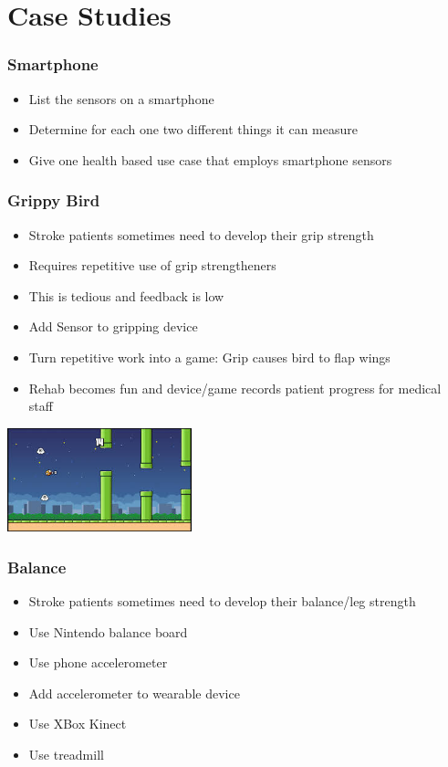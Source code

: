 \documentclass{beamer}
\begin{document}
 \section{Case Studies}
\begin{frame}
	\frametitle{Smartphone}
	
     \begin{itemize}
     	\item List the sensors on a smartphone
     	\item Determine for each one two different things it can measure
     	\item Give one health based use case that employs smartphone sensors
     \end{itemize}
     

\end{frame}

  \begin{frame}
  	\frametitle{Grippy Bird}
  	
  	\begin{itemize}
  		\item Stroke patients sometimes need to develop their grip strength
  		\item Requires repetitive use of grip strengtheners
  		\item This is tedious and feedback is low
  		\item Add Sensor to gripping device
  		\item Turn repetitive work into a game: Grip causes bird to flap wings 
  		\item Rehab becomes fun and device/game records patient progress for medical staff
  	\end{itemize}
  		\includegraphics[height=3cm]{flappy.jpg}
  	
  \end{frame}

      \begin{frame}
      	\frametitle{Balance}
      	
      	\begin{itemize}
      		\item Stroke patients sometimes need to develop their balance/leg strength
      		\item Use Nintendo balance board
      		\item Use phone accelerometer
      		\item Add accelerometer to wearable device
      		\item Use XBox Kinect
      		\item Use treadmill 
      	\end{itemize}
      	
      	
      \end{frame}

        
\end{document}
